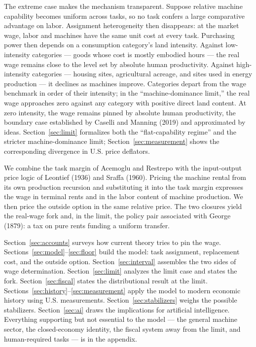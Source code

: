 \documentclass[12pt]{article}
\theoremstyle{plain}
\begin{document}
The extreme case makes the mechanism transparent. Suppose relative machine capability becomes uniform across tasks, so no task confers a large comparative advantage on labor. Assignment heterogeneity then disappears: at the market wage, labor and machines have the same unit cost at every task. Purchasing power then depends on a consumption category's land intensity. Against low-intensity categories --- goods whose cost is mostly embodied hours --- the real wage remains close to the level set by absolute human productivity. Against high-intensity categories --- housing sites, agricultural acreage, and sites used in energy production --- it declines as machines improve. Categories depart from the wage benchmark in order of their intensity; in the ``machine-dominance limit,'' the real wage approaches zero against any category with positive direct land content. At zero intensity, the wage remains pinned by absolute human productivity, the boundary case established by Caselli and Manning (2019) and approximated by ideas. Section~\ref{sec:limit} formalizes both the ``flat-capability regime'' and the stricter machine-dominance limit; Section~\ref{sec:measurement} shows the corresponding divergence in U.S. price deflators.

We combine the task margin of Acemoglu and Restrepo with the input-output price logic of Leontief (1936) and Sraffa (1960). Pricing the machine rental from its own production recursion and substituting it into the task margin expresses the wage in terminal rents and in the labor content of machine production. We then price the outside option in the same relative price. The two closures yield the real-wage fork and, in the limit, the policy pair associated with George (1879): a tax on pure rents funding a uniform transfer.

Section~\ref{sec:accounts} surveys how current theory tries to pin the wage.
Sections~\ref{sec:model}--\ref{sec:floor} build the model: task assignment,
replacement cost, and the outside option. Section~\ref{sec:interval} assembles
the two sides of wage determination. Section~\ref{sec:limit} analyzes the limit
case and states the fork. Section~\ref{sec:fiscal} states the distributional result at the limit.
Sections~\ref{sec:history}--\ref{sec:measurement} apply the model to modern
economic history using U.S. measurements. Section~\ref{sec:stabilizers} weighs
the possible stabilizers. Section~\ref{sec:ai} draws the implications for
artificial intelligence. Everything supporting but not essential to the model
--- the general machine sector, the closed-economy identity, the fiscal system
away from the limit, and human-required tasks --- is in the appendix.
\end{document}
